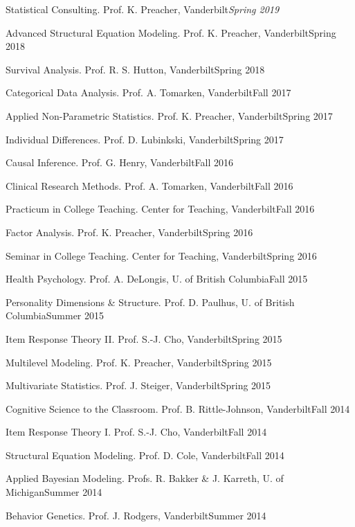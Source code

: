 \begin{etaremune}
\item Statistical Consulting. Prof. K. Preacher, Vanderbilt\hfill{\em{Spring 2019}}
\item Advanced Structural Equation Modeling. Prof. K. Preacher, Vanderbilt\hfill{Spring 2018}
\item Survival Analysis. Prof. R. S. Hutton, Vanderbilt\hfill{Spring 2018}
\item Categorical Data Analysis. Prof. A. Tomarken, Vanderbilt\hfill{Fall 2017}
\item Applied Non-Parametric Statistics.  Prof. K. Preacher, Vanderbilt\hfill{Spring 2017}
\item Individual Differences.  Prof. D. Lubinkski, Vanderbilt\hfill{Spring 2017}
\item Causal Inference. Prof. G. Henry, Vanderbilt\hfill{Fall 2016}
\item Clinical Research Methods. Prof. A. Tomarken, Vanderbilt\hfill{Fall 2016}
\item Practicum in College Teaching. Center for Teaching, Vanderbilt\hfill{Fall 2016}
\item Factor Analysis. Prof. K. Preacher, Vanderbilt\hfill{Spring 2016}
\item Seminar in College Teaching. Center for Teaching, Vanderbilt\hfill{Spring 2016}
\item Health Psychology.  Prof. A. DeLongis, U. of British Columbia\hfill{Fall 2015}
\item Personality Dimensions \& Structure.  Prof. D. Paulhus, U. of British Columbia\hfill{Summer 2015}
\item Item Response Theory \textrm{II}. Prof. S.-J. Cho, Vanderbilt\hfill{Spring 2015}
\item Multilevel Modeling. Prof. K. Preacher, Vanderbilt\hfill{Spring 2015}
\item Multivariate Statistics. Prof. J. Steiger, Vanderbilt\hfill{Spring 2015}
\item Cognitive Science to the Classroom. Prof. B. Rittle-Johnson, Vanderbilt\hfill{Fall 2014}
\item Item Response Theory \textrm{I}. Prof. S.-J. Cho, Vanderbilt\hfill{Fall 2014}
\item Structural Equation Modeling. Prof. D. Cole, Vanderbilt\hfill{Fall 2014}
\item Applied Bayesian Modeling. Profs. R. Bakker \& J. Karreth, U. of Michigan\hfill{Summer 2014}
\item Behavior Genetics. Prof. J. Rodgers, Vanderbilt\hfill{Summer 2014}

\end{etaremune}
